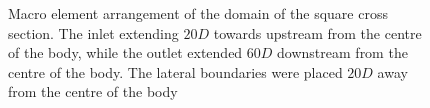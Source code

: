 \begin{figure}[h!]
\setlength{\unitlength}{\textwidth}
 \caption{Macro element arrangement of the domain of the square cross section. The inlet extending  $20D$ towards upstream from the centre of the body, while the outlet extended $60D$ downstream from the centre of the body. The lateral boundaries were placed $20D$ away from the centre of the body}
    \label{fig:square-mesh}
\end{figure}